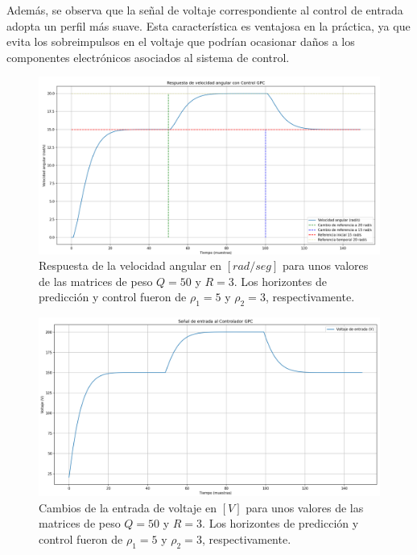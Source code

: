 \documentclass[journal]{IEEEtran}
\begin{document}
Además, se observa que la señal de voltaje correspondiente al control de entrada adopta un perfil más suave. Esta característica es ventajosa en la práctica, ya que evita los sobreimpulsos en el voltaje que podrían ocasionar daños a los componentes electrónicos asociados al sistema de control.

\begin{figure}[H]
    \centering
    \includegraphics[width=1\linewidth]{imagen-7.png}
    \caption{Respuesta de la velocidad angular en $[rad/seg]$ para unos valores de las matrices de peso $Q = 50$ y $R= 3$. Los horizontes de predicción y control fueron de $\rho_1 = 5$  y $\rho_2 = 3$, respectivamente. }
    \label{fig:practico-5}
\end{figure}


\begin{figure}[H]
    \centering
    \includegraphics[width=1\linewidth]{imagen 8.png}
    \caption{Cambios de la entrada de voltaje en $[V]$ para unos valores de las matrices de peso $Q = 50$ y $R= 3$. Los horizontes de predicción y control fueron de $\rho_1 = 5$  y $\rho_2 = 3$, respectivamente. }
    \label{fig:practico-6}
\end{figure}
\end{document}
